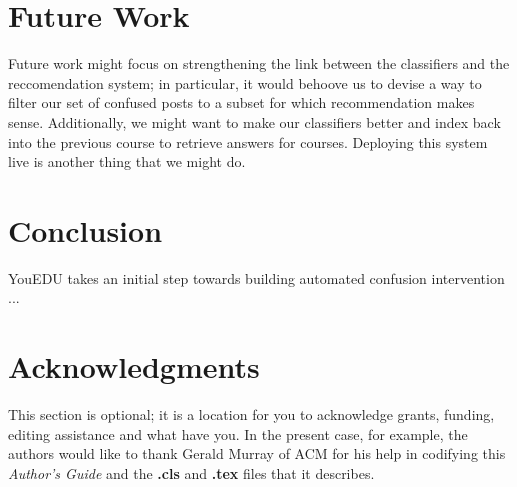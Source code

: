 \documentclass{edm_template}
\begin{document}
\section{Future Work}
Future work might focus on strengthening the link between the classifiers and the reccomendation system; in particular, it would behoove us to devise a way to filter our set of confused posts to a subset for which recommendation makes sense. Additionally, we might want to make our classifiers better and index back into the previous course to retrieve answers for courses. Deploying this system live is another thing that we might do. 

\section{Conclusion}
YouEDU takes an initial step towards building automated confusion intervention ... 


\section{Acknowledgments}
This section is optional\cite{wen2014sentiment}; it is a location for you
to acknowledge grants, funding, editing assistance and
what have you.  In the present case, for example, the
authors would like to thank Gerald Murray of ACM for
his help in codifying this \textit{Author's Guide}
and the \textbf{.cls} and \textbf{.tex} files that it describes.

%

%
%
\balancecolumns
\end{document}
